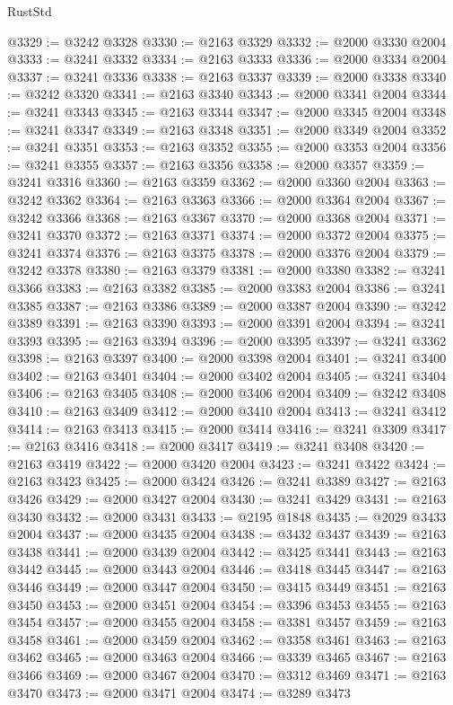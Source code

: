 \begin{lexlean}{RustStd}
\begin{coremodule}
@3329 := @3242 @3328
@3330 := @2163 @3329
@3332 := @2000 @3330 @2004
@3333 := @3241 @3332
@3334 := @2163 @3333
@3336 := @2000 @3334 @2004
@3337 := @3241 @3336
@3338 := @2163 @3337
@3339 := @2000 @3338
@3340 := @3242 @3320
@3341 := @2163 @3340
@3343 := @2000 @3341 @2004
@3344 := @3241 @3343
@3345 := @2163 @3344
@3347 := @2000 @3345 @2004
@3348 := @3241 @3347
@3349 := @2163 @3348
@3351 := @2000 @3349 @2004
@3352 := @3241 @3351
@3353 := @2163 @3352
@3355 := @2000 @3353 @2004
@3356 := @3241 @3355
@3357 := @2163 @3356
@3358 := @2000 @3357
@3359 := @3241 @3316
@3360 := @2163 @3359
@3362 := @2000 @3360 @2004
@3363 := @3242 @3362
@3364 := @2163 @3363
@3366 := @2000 @3364 @2004
@3367 := @3242 @3366
@3368 := @2163 @3367
@3370 := @2000 @3368 @2004
@3371 := @3241 @3370
@3372 := @2163 @3371
@3374 := @2000 @3372 @2004
@3375 := @3241 @3374
@3376 := @2163 @3375
@3378 := @2000 @3376 @2004
@3379 := @3242 @3378
@3380 := @2163 @3379
@3381 := @2000 @3380
@3382 := @3241 @3366
@3383 := @2163 @3382
@3385 := @2000 @3383 @2004
@3386 := @3241 @3385
@3387 := @2163 @3386
@3389 := @2000 @3387 @2004
@3390 := @3242 @3389
@3391 := @2163 @3390
@3393 := @2000 @3391 @2004
@3394 := @3241 @3393
@3395 := @2163 @3394
@3396 := @2000 @3395
@3397 := @3241 @3362
@3398 := @2163 @3397
@3400 := @2000 @3398 @2004
@3401 := @3241 @3400
@3402 := @2163 @3401
@3404 := @2000 @3402 @2004
@3405 := @3241 @3404
@3406 := @2163 @3405
@3408 := @2000 @3406 @2004
@3409 := @3242 @3408
@3410 := @2163 @3409
@3412 := @2000 @3410 @2004
@3413 := @3241 @3412
@3414 := @2163 @3413
@3415 := @2000 @3414
@3416 := @3241 @3309
@3417 := @2163 @3416
@3418 := @2000 @3417
@3419 := @3241 @3408
@3420 := @2163 @3419
@3422 := @2000 @3420 @2004
@3423 := @3241 @3422
@3424 := @2163 @3423
@3425 := @2000 @3424
@3426 := @3241 @3389
@3427 := @2163 @3426
@3429 := @2000 @3427 @2004
@3430 := @3241 @3429
@3431 := @2163 @3430
@3432 := @2000 @3431
@3433 := @2195 @1848
@3435 := @2029 @3433 @2004
@3437 := @2000 @3435 @2004
@3438 := @3432 @3437
@3439 := @2163 @3438
@3441 := @2000 @3439 @2004
@3442 := @3425 @3441
@3443 := @2163 @3442
@3445 := @2000 @3443 @2004
@3446 := @3418 @3445
@3447 := @2163 @3446
@3449 := @2000 @3447 @2004
@3450 := @3415 @3449
@3451 := @2163 @3450
@3453 := @2000 @3451 @2004
@3454 := @3396 @3453
@3455 := @2163 @3454
@3457 := @2000 @3455 @2004
@3458 := @3381 @3457
@3459 := @2163 @3458
@3461 := @2000 @3459 @2004
@3462 := @3358 @3461
@3463 := @2163 @3462
@3465 := @2000 @3463 @2004
@3466 := @3339 @3465
@3467 := @2163 @3466
@3469 := @2000 @3467 @2004
@3470 := @3312 @3469
@3471 := @2163 @3470
@3473 := @2000 @3471 @2004
@3474 := @3289 @3473

\end{coremodule}
\end{lexlean}
